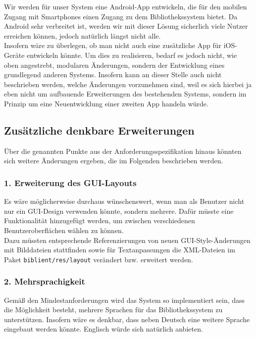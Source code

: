 \documentclass[fontsize=12pt,paper=a4,twoside]{scrartcl}
\begin{document}
Wir werden für unser System eine Android-App entwickeln, die für den mobilen Zugang mit Smartphones einen Zugang zu dem Bibliothekssystem bietet. Da Android sehr verbreitet ist, werden wir mit dieser Lösung sicherlich viele Nutzer erreichen können, jedoch natürlich längst nicht alle. \\
Insofern wäre zu überlegen, ob man nicht auch eine zusätzliche App für iOS-Geräte entwickeln könnte. Um dies zu realisieren, bedarf es jedoch nicht, wie oben angestrebt, modularen Änderungen, sondern der Entwicklung eines grundlegend anderen Systems. Insofern kann an dieser Stelle auch nicht beschrieben werden, welche Änderungen vorzunehmen sind, weil es sich hierbei ja eben nicht um aufbauende Erweiterungen des bestehenden Systems, sondern im Prinzip um eine Neuentwicklung einer zweiten App handeln  würde.

\subsection*{Zusätzliche denkbare Erweiterungen}

Über die genannten Punkte aus der Anforderungsspezifikation hinaus könnten sich weitere Änderungen ergeben, die im Folgenden beschrieben werden.

\subsubsection*{1. Erweiterung des GUI-Layouts}

Es wäre möglicherweise durchaus wünschenswert, wenn man als Benutzer nicht nur ein GUI-Design verwenden könnte, sondern mehrere. Dafür müsste eine Funktionalität hinzugefügt werden, um zwischen verschiedenen Benutzeroberflächen wählen zu können. \\
Dazu müssten entsprechende Referenzierungen von neuen GUI-Style-Änderungen mit Bilddateien stattfinden sowie für Textanpassungen die XML-Dateien im Paket \texttt{biblient/res/layout} verändert bzw. erweitert werden. 

\subsubsection*{2. Mehrsprachigkeit}

Gemäß den Mindestanforderungen wird das System so implementiert sein, dass die Möglichkeit besteht, mehrere Sprachen für das Bibliothekssystem zu unterstützen. Insofern wäre es denkbar, dass neben Deutsch eine weitere Sprache eingebaut werden könnte. Englisch würde sich natürlich anbieten.
\end{document}
